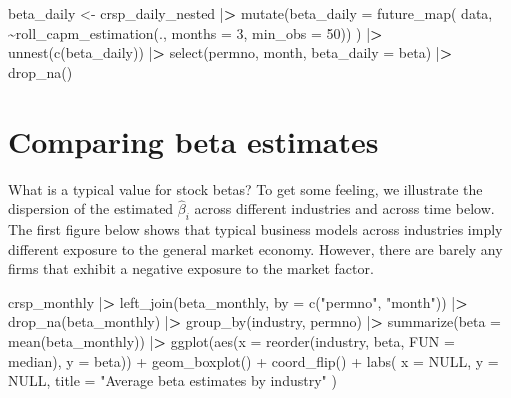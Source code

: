 \documentclass[
]{book}
\newenvironment{Shaded}{\begin{snugshade}}{\end{snugshade}}
\newcommand{\AttributeTok}[1]{\textcolor[rgb]{0.61,0.61,0.61}{#1}}
\newcommand{\ConstantTok}[1]{\textcolor[rgb]{0,0,0}{#1}}
\newcommand{\DecValTok}[1]{\textcolor[rgb]{0.06,0.06,0.06}{#1}}
\newcommand{\ErrorTok}[1]{\textcolor[rgb]{0.14,0.14,0.14}{\textbf{#1}}}
\newcommand{\FunctionTok}[1]{\textcolor[rgb]{0,0,0}{#1}}
\newcommand{\NormalTok}[1]{#1}
\newcommand{\OtherTok}[1]{\textcolor[rgb]{0.37,0.37,0.37}{#1}}
\newcommand{\SpecialCharTok}[1]{\textcolor[rgb]{0,0,0}{#1}}
\newcommand{\StringTok}[1]{\textcolor[rgb]{0.5,0.5,0.5}{#1}}
\begin{document}
\begin{Shaded}
\begin{Highlighting}[]
\NormalTok{beta\_daily }\OtherTok{\textless{}{-}}\NormalTok{ crsp\_daily\_nested }\SpecialCharTok{|}\ErrorTok{\textgreater{}}
  \FunctionTok{mutate}\NormalTok{(}\AttributeTok{beta\_daily =} \FunctionTok{future\_map}\NormalTok{(}
\NormalTok{    data, }\SpecialCharTok{\textasciitilde{}}\FunctionTok{roll\_capm\_estimation}\NormalTok{(., }\AttributeTok{months =} \DecValTok{3}\NormalTok{, }\AttributeTok{min\_obs =} \DecValTok{50}\NormalTok{))}
\NormalTok{    ) }\SpecialCharTok{|}\ErrorTok{\textgreater{}}
  \FunctionTok{unnest}\NormalTok{(}\FunctionTok{c}\NormalTok{(beta\_daily)) }\SpecialCharTok{|}\ErrorTok{\textgreater{}}
  \FunctionTok{select}\NormalTok{(permno, month, }\AttributeTok{beta\_daily =}\NormalTok{ beta) }\SpecialCharTok{|}\ErrorTok{\textgreater{}}
  \FunctionTok{drop\_na}\NormalTok{()}
\end{Highlighting}
\end{Shaded}

\hypertarget{comparing-beta-estimates}{%
\section{Comparing beta estimates}\label{comparing-beta-estimates}}

What is a typical value for stock betas? To get some feeling, we illustrate the dispersion of the estimated \(\hat\beta_i\) across different industries and across time below. The first figure below shows that typical business models across industries imply different exposure to the general market economy. However, there are barely any firms that exhibit a negative exposure to the market factor.

\begin{Shaded}
\begin{Highlighting}[]
\NormalTok{crsp\_monthly }\SpecialCharTok{|}\ErrorTok{\textgreater{}}
  \FunctionTok{left\_join}\NormalTok{(beta\_monthly, }\AttributeTok{by =} \FunctionTok{c}\NormalTok{(}\StringTok{"permno"}\NormalTok{, }\StringTok{"month"}\NormalTok{)) }\SpecialCharTok{|}\ErrorTok{\textgreater{}}
  \FunctionTok{drop\_na}\NormalTok{(beta\_monthly) }\SpecialCharTok{|}\ErrorTok{\textgreater{}}
  \FunctionTok{group\_by}\NormalTok{(industry, permno) }\SpecialCharTok{|}\ErrorTok{\textgreater{}}
  \FunctionTok{summarize}\NormalTok{(}\AttributeTok{beta =} \FunctionTok{mean}\NormalTok{(beta\_monthly)) }\SpecialCharTok{|}\ErrorTok{\textgreater{}}
  \FunctionTok{ggplot}\NormalTok{(}\FunctionTok{aes}\NormalTok{(}\AttributeTok{x =} \FunctionTok{reorder}\NormalTok{(industry, beta, }\AttributeTok{FUN =}\NormalTok{ median), }\AttributeTok{y =}\NormalTok{ beta)) }\SpecialCharTok{+}
  \FunctionTok{geom\_boxplot}\NormalTok{() }\SpecialCharTok{+}
  \FunctionTok{coord\_flip}\NormalTok{() }\SpecialCharTok{+}
  \FunctionTok{labs}\NormalTok{(}
    \AttributeTok{x =} \ConstantTok{NULL}\NormalTok{, }\AttributeTok{y =} \ConstantTok{NULL}\NormalTok{,}
    \AttributeTok{title =} \StringTok{"Average beta estimates by industry"}
\NormalTok{  )}
\end{Highlighting}
\end{Shaded}
\end{document}
